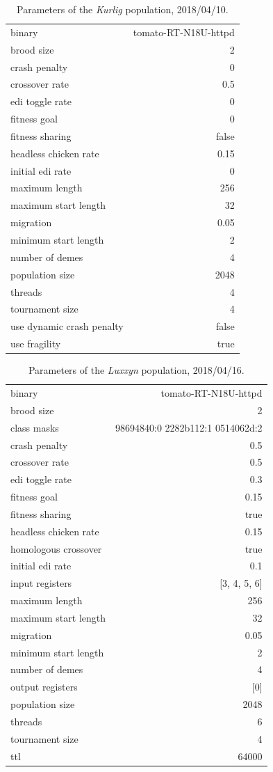 \documentclass[12pt,glossary]{dalthesis}
\begin{document}
\begin{table}[htbp]
\caption{Parameters of the \emph{Kurlig} population, 2018/04/10.}
\centering
\begin{tabular}{lr}
binary & tomato-RT-N18U-httpd\\
brood size & 2\\
crash penalty & 0\\
crossover rate & 0.5\\
edi toggle rate & 0\\
fitness goal & 0\\
fitness sharing & false\\
headless chicken rate & 0.15\\
initial edi rate & 0\\
maximum length & 256\\
maximum start length & 32\\
migration & 0.05\\
minimum start length & 2\\
number of demes & 4\\
population size & 2048\\
threads & 4\\
tournament size & 4\\
use dynamic crash penalty & false\\
use fragility & true\\
\end{tabular}
\end{table}

\begin{table}[htbp]
\caption{Parameters of the \emph{Luxxyn} population, 2018/04/16.}
\centering
\begin{tabular}{lr}
binary & tomato-RT-N18U-httpd\\
brood size & 2\\
class masks & 98694840:0 2282b112:1 0514062d:2\\
crash penalty & 0.5\\
crossover rate & 0.5\\
edi toggle rate & 0.3\\
fitness goal & 0.15\\
fitness sharing & true\\
headless chicken rate & 0.15\\
homologous crossover & true\\
initial edi rate & 0.1\\
input registers & [3, 4, 5, 6]\\
maximum length & 256\\
maximum start length & 32\\
migration & 0.05\\
minimum start length & 2\\
number of demes & 4\\
output registers & [0]\\
population size & 2048\\
threads & 6\\
tournament size & 4\\
ttl & 64000\\
\end{tabular}
\end{table}
\end{document}
